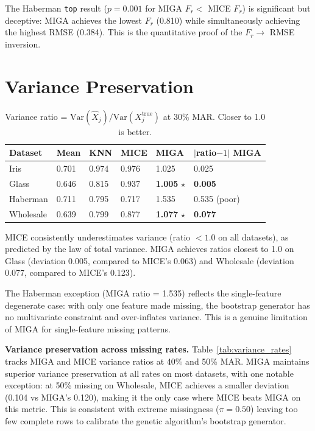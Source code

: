 The Haberman \texttt{top} result ($p = 0.001$ for MIGA $F_r <$ MICE $F_r$) is significant but deceptive: MIGA achieves the lowest $F_r$ (0.810) while simultaneously achieving the highest RMSE (0.384). This is the quantitative proof of the $F_r \rightarrow$ RMSE inversion.


\section{Variance Preservation}

\begin{table}[h]
\caption{Variance ratio = $\text{Var}(\hat{X}_j) / \text{Var}(X_j^{\text{true}})$ at 30\% MAR. Closer to 1.0 is better.}
\label{tab:variance}
\centering
\begin{tabular}{llllll}
\toprule
\textbf{Dataset} & \textbf{Mean} & \textbf{KNN} & \textbf{MICE} & \textbf{MIGA} & $|$\textbf{ratio}$-1|$ MIGA \\
\midrule
Iris      & 0.701 & 0.974 & 0.976 & 1.025 & 0.025 \\
Glass     & 0.646 & 0.815 & 0.937 & \textbf{1.005} $\star$ & \textbf{0.005} \\
Haberman  & 0.711 & 0.795 & 0.717 & 1.535 & 0.535 (poor) \\
Wholesale & 0.639 & 0.799 & 0.877 & \textbf{1.077} $\star$ & \textbf{0.077} \\
\bottomrule
\end{tabular}
\end{table}

MICE consistently underestimates variance (ratio $< 1.0$ on all datasets), as predicted by the law of total variance. MIGA achieves ratios closest to 1.0 on Glass (deviation 0.005, compared to MICE's 0.063) and Wholesale (deviation 0.077, compared to MICE's 0.123).

The Haberman exception (MIGA ratio = 1.535) reflects the single-feature degenerate case: with only one feature made missing, the bootstrap generator has no multivariate constraint and over-inflates variance. This is a genuine limitation of MIGA for single-feature missing patterns.

\textbf{Variance preservation across missing rates.} Table~\ref{tab:variance_rates} tracks MIGA and MICE variance ratios at 40\% and 50\% MAR. MIGA maintains superior variance preservation at all rates on most datasets, with one notable exception: at 50\% missing on Wholesale, MICE achieves a smaller deviation (0.104 vs MIGA's 0.120), making it the only case where MICE beats MIGA on this metric. This is consistent with extreme missingness ($\pi=0.50$) leaving too few complete rows to calibrate the genetic algorithm's bootstrap generator.

